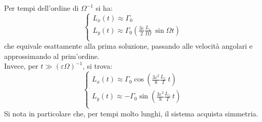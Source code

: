 \documentclass[../main.tex]{subfiles}
\begin{document}
Per tempi dell'ordine di $\Omega^{-1}$ si ha: 
\begin{equation*}
\begin{cases}
		\displaystyle L_x(t)\approx \Gamma_0 \\
                     \displaystyle L_y(t)\approx \Gamma_0  \left(\frac{3\varepsilon }{2} \frac{L_z}{I\Omega}  \ {\sin \Omega t} \right) \\
	\end{cases}
\end{equation*}
che equivale esattamente alla prima soluzione, passando alle velocità angolari e approssimando al prim'ordine.  \\ Invece, per $t\gg (\varepsilon\Omega)^{-1}$, si trova:
\begin{equation*}
\begin{cases}
		\displaystyle L_x(t)\approx\Gamma_0 \cos \left(\frac{3\varepsilon^2 }{8} \frac{L_z}{I}\  t\right) \\
                     \displaystyle L_y(t)\approx-\Gamma_0 \sin \left(\frac{3\varepsilon^2 }{8} \frac{L_z}{I} \ t\right) \\
	\end{cases}
\end{equation*}
Si nota in particolare che, per tempi molto lunghi, il sistema acquista simmetria.
\end{document}
